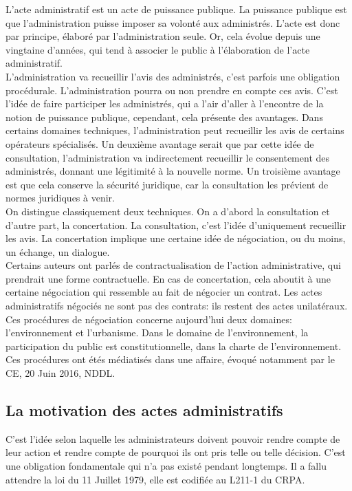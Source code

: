 \documentclass[10pt, a4paper, openany]{book}
\begin{document}
L'acte administratif est un acte de puissance publique. La puissance publique est que l'administration puisse imposer sa volonté aux administrés. L'acte est donc par principe, élaboré par l'administration seule. Or, cela évolue depuis une vingtaine d'années, qui tend à associer le public à l'élaboration de l'acte administratif. \\
L'administration va recueillir l'avis des administrés, c'est parfois une obligation procédurale. L'administration pourra ou non prendre en compte ces avis. C'est l'idée de faire participer les administrés, qui a l'air d'aller à l'encontre de la notion de puissance publique, cependant, cela présente des avantages. Dans certains domaines techniques, l'administration peut recueillir les avis de certains opérateurs spécialisés. Un deuxième avantage serait que par cette idée de consultation, l'administration va indirectement recueillir le consentement des administrés, donnant une légitimité à la nouvelle norme. Un troisième avantage est que cela conserve la sécurité juridique, car la consultation les prévient de normes juridiques à venir. \\
On distingue classiquement deux techniques. On a d'abord la consultation et d'autre part, la concertation. La consultation, c'est l'idée d'uniquement recueillir les avis. La concertation implique une certaine idée de négociation, ou du moins, un échange, un dialogue. \\
Certains auteurs ont parlés de contractualisation de l'action administrative, qui prendrait une forme contractuelle. En cas de concertation, cela aboutit à une certaine négociation qui ressemble au fait de négocier un contrat. Les actes administratifs négociés ne sont pas des contrats: ils restent des actes unilatéraux. \\
Ces procédures de négociation concerne aujourd'hui deux domaines: l'environnement et l'urbanisme. Dans le domaine de l'environnement, la participation du public est constitutionnelle, dans la charte de l'environnement. \\
Ces procédures ont étés médiatisés dans une affaire, évoqué notamment par le CE, 20 Juin 2016, NDDL. 

\subsection{La motivation des actes administratifs}

C'est l'idée selon laquelle les administrateurs doivent pouvoir rendre compte de leur action et rendre compte de pourquoi ils ont pris telle ou telle décision. C'est une obligation fondamentale qui n'a pas existé pendant longtemps. Il a fallu attendre la loi du 11 Juillet 1979, elle est codifiée au L211-1 du CRPA. 
\end{document}
